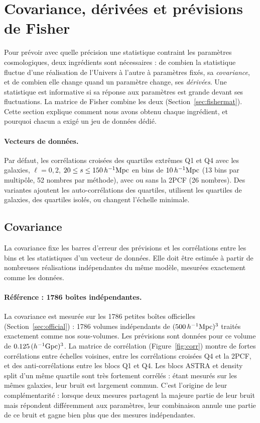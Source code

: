 \section{Covariance, dérivées et prévisions de Fisher}
\label{sec:framework}

Pour prévoir avec quelle précision une statistique contraint les paramètres cosmologiques, deux ingrédients sont nécessaires : de combien la statistique fluctue d'une réalisation de l'Univers à l'autre à paramètres fixés, sa \emph{covariance}, et de combien elle change quand un paramètre change, ses \emph{dérivées}. Une statistique est informative si sa réponse aux paramètres est grande devant ses fluctuations. La matrice de Fisher combine les deux (Section~\ref{sec:fishermat}). Cette section explique comment nous avons obtenu chaque ingrédient, et pourquoi chacun a exigé un jeu de données dédié.

\paragraph{Vecteurs de données.} Par défaut, les corrélations croisées des quartiles extrêmes Q1 et Q4 avec les galaxies, $\ell=0,2$, $20\le s\le150\,h^{-1}\mathrm{Mpc}$ en bins de $10\,h^{-1}\mathrm{Mpc}$ (13 bins par multipôle, 52 nombres par méthode), avec ou sans la 2PCF (26 nombres). Des variantes ajoutent les auto-corrélations des quartiles, utilisent les quartiles de galaxies, des quartiles isolés, ou changent l'échelle minimale.

\subsection{Covariance}

La covariance fixe les barres d'erreur des prévisions et les corrélations entre les bins et les statistiques d'un vecteur de données. Elle doit être estimée à partir de nombreuses réalisations indépendantes du même modèle, mesurées exactement comme les données. \paragraph{Référence : 1786 boîtes indépendantes.} La covariance est mesurée sur les 1786 petites boîtes officielles (Section~\ref{sec:official}) : 1786 volumes indépendants de $(500\,h^{-1}\mathrm{Mpc})^3$ traités exactement comme nos sous-volumes. Les prévisions sont données pour ce volume de $0.125\,(h^{-1}{\rm Gpc})^3$. La matrice de corrélation (Figure~\ref{fig:corr}) montre de fortes corrélations entre échelles voisines, entre les corrélations croisées Q4 et la 2PCF, et des anti-corrélations entre les blocs Q1 et Q4. Les blocs ASTRA et density split d'un même quartile sont très fortement corrélés : étant mesurés sur les mêmes galaxies, leur bruit est largement commun. C'est l'origine de leur complémentarité : lorsque deux mesures partagent la majeure partie de leur bruit mais répondent différemment aux paramètres, leur combinaison annule une partie de ce bruit et gagne bien plus que des mesures indépendantes.

